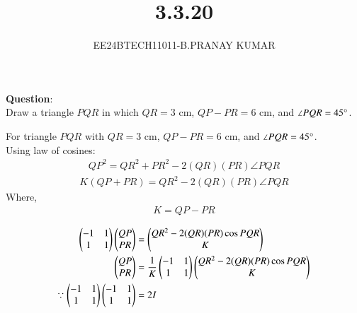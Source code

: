 \documentclass[journal]{IEEEtran}
\begin{document}

\vspace{3cm}

\title{3.3.20}
\author{EE24BTECH11011-B.PRANAY KUMAR
}
 \maketitle
{\let\newpage\relax\maketitle}

\renewcommand{\thefigure}{\theenumi}
\renewcommand{\thetable}{\theenumi}
\setlength{\intextsep}{10pt} %


\renewcommand{\thetable}{\theenumi}



\textbf{Question}:\\
Draw a triangle $PQR$ in which $QR = 3$ cm, $QP - PR = 6$ cm, and $\angle PQR = 45\degree$.\\

\solution

For triangle $PQR$ with $QR = 3$ cm, $QP - PR = 6$ cm, and $\angle PQR = 45\degree$.\\
Using law of cosines:
\begin{align}
    QP^2 = QR^2 + PR^2 - 2(QR) (PR) \angle PQR 
\end{align}
\begin{align}
    K (QP+PR) = QR^2 - 2 (QR) (PR) \angle PQR 
\end{align}
Where,
\begin{align}
    K = QP-PR
\end{align}

\begin{align}
    \begin{pmatrix}-1 & 1 \\ 1 & 1\end{pmatrix} \begin{pmatrix}QP\\ PR\end{pmatrix} &= \begin{pmatrix}QR^2 - 2(QR)(PR) \cos PQR \\ K\end{pmatrix} \\
    \begin{pmatrix}QP \\ PR\end{pmatrix} &= \frac{1}{K} \begin{pmatrix}-1 & 1 \\ 1 & 1\end{pmatrix} \begin{pmatrix}QR^2 - 2(QR)(PR) \cos PQR \\ K\end{pmatrix} \\
    \because \begin{pmatrix}-1 & 1 \\ 1 & 1\end{pmatrix} \begin{pmatrix}-1 & 1 \\ 1 & 1\end{pmatrix} &= 2I
\end{align}
\end{document}
